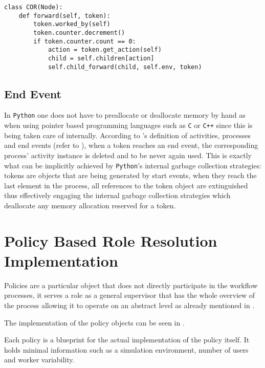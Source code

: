 \begin{lstlisting}[caption=Token's counter decrement logic at a convergent \glsentryshort{or} gateway,label=lst:or_counter_decrement,style=CustomPython]
class COR(Node):
    def forward(self, token):
        token.worked_by(self)
        token.counter.decrement()
        if token.counter.count == 0:
            action = token.get_action(self)
            child = self.children[action]
            self.child_forward(child, self.env, token)
\end{lstlisting}

\subsection{End Event}

In \texttt{Python} one does not have to preallocate or deallocate memory by hand as when using pointer based programming languages such as \texttt{C} or \texttt{C++} since this is being taken care of internally. According to \citet{Silver2011}'s definition of activities, processes and end events (refer to ), when a token reaches an end event, the corresponding process' activity instance is deleted and to be never again used. This is exactly what can be implicitly achieved by \texttt{Python}'s internal garbage collection strategies: tokens are objects that are being generated by start events, when they reach the last element in the process, all references to the token object are extinguished thus effectively engaging the internal garbage collection strategies which deallocate any memory allocation reserved for a token.

\section{Policy Based Role Resolution Implementation}
\label{sec:policy_implementation}

Policies are a particular object that does not directly participate in the workflow processes, it serves a role as a general supervisor that has the whole overview of the process allowing it to operate on an abstract level as already mentioned in . 

The implementation of the policy objects can be seen in .


Each policy is a blueprint for the actual implementation of the policy itself. It holds minimal information such as a simulation environment, number of users and worker variability.


